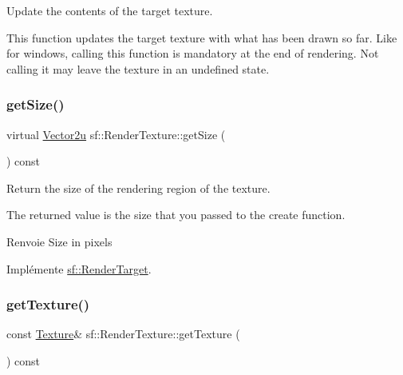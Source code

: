 Update the contents of the target texture. 

This function updates the target texture with what has been drawn so far. Like for windows, calling this function is mandatory at the end of rendering. Not calling it may leave the texture in an undefined state. \mbox{\label{classsf_1_1RenderTexture_a6685315b5c4c25a5dcb75b4280b381ba}} 
\subsubsection{\texorpdfstring{get\+Size()}{getSize()}}
{\footnotesize\ttfamily virtual \hyperlink{classsf_1_1Vector2}{Vector2u} sf\+::\+Render\+Texture\+::get\+Size (\begin{DoxyParamCaption}{ }\end{DoxyParamCaption}) const\hspace{0.3cm}{\ttfamily [virtual]}}



Return the size of the rendering region of the texture. 

The returned value is the size that you passed to the create function.

\begin{DoxyReturn}{Renvoie}
Size in pixels 
\end{DoxyReturn}


Implémente \hyperlink{classsf_1_1RenderTarget_a2e5ade2457d9fb4c4907ae5b3d9e94a5}{sf\+::\+Render\+Target}.

\mbox{\label{classsf_1_1RenderTexture_a07ecea85f05932fa02a8279416721bc9}} 
\subsubsection{\texorpdfstring{get\+Texture()}{getTexture()}}
{\footnotesize\ttfamily const \hyperlink{classsf_1_1Texture}{Texture}\& sf\+::\+Render\+Texture\+::get\+Texture (\begin{DoxyParamCaption}{ }\end{DoxyParamCaption}) const}



